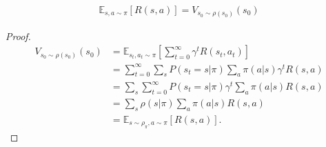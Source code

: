 \begin{conclusion}
\begin{align}
  \mathbb{E}_{s, a \sim \pi}[R(s, a)] = V_{s_0 \sim \rho(s_0)}(s_0)
\end{align}
\end{conclusion}

\begin{proof}
\begin{align}
  V_{s_0 \sim \rho(s_0)}(s_0)
  &= \mathbb{E}_{s_t, a_t \sim \pi}[\sum_{t = 0}^{\infty}\gamma^t R(s_t, a_t)]
  \\
  &= \sum_{t = 0}^{\infty} \sum_{s}P(s_t = s | \pi) \sum_{a}\pi(a|s)\gamma^t R(s, a)\\
  &= \sum_{s} \sum_{t=0}^{\infty} P(s_t = s | \pi)\gamma^t \sum_{a}\pi(a|s) R(s, a)\\
  &= \sum_{s} \rho(s|\pi) \sum_{a}\pi(a|s) R(s, a)\\
  &= \mathbb{E}_{s\sim \rho_{\pi}, a \sim \pi}[R(s, a)].
\end{align}
\end{proof}
%
%
%
%
%
